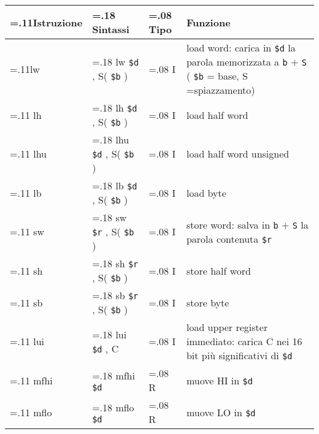 \documentclass{standalone}
\providecommand\lightrule{%
	\arrayrulecolor{black!30}%
	\midrule[\lightrulewidth]%
	\arrayrulecolor{black}}
\providecommand\register[1]{%
	\texttt{#1}%
}
\begin{document}
\begin{tabularx}{\textwidth}{ >{\hsize=.11\textwidth}X >{\hsize=.18\textwidth}X >{\hsize=.08\textwidth}X X }
	\toprule
		Istruzione & Sintassi & Tipo & Funzione \\
	\midrule
		lw & lw \register{\$d}, S(\register{\$b}) & I & load word: carica in \register{\$d} la parola memorizzata a \register{b}\(+\)\register{S} (\register{\$b} = base, S =spiazzamento) \\\lightrule
		lh & lh \register{\$d}, S(\register{\$b}) & I & load half word \\\lightrule
		lhu & lhu \register{\$d}, S(\register{\$b}) & I & load half word unsigned \\\lightrule
		lb & lb \register{\$d}, S(\register{\$b}) & I & load byte \\\lightrule
		sw & sw \register{\$r}, S(\register{\$b}) & I & store word: salva in \register{b}\(+\)\register{S} la parola contenuta \register{\$r} \\\lightrule
		sh & sh \register{\$r}, S(\register{\$b}) & I & store half word \\\lightrule
		sb & sb \register{\$r}, S(\register{\$b}) & I & store byte \\\lightrule
		lui & lui \register{\$d}, C & I &  load upper register immediato: carica C nei 16 bit più significativi di \register{\$d} \\\lightrule
		mfhi & mfhi \register{\$d} & R & muove HI in \register{\$d} \\\lightrule
		mflo & mflo \register{\$d} & R & muove LO in \register{\$d} \\
	\bottomrule
\end{tabularx}
\end{document}

